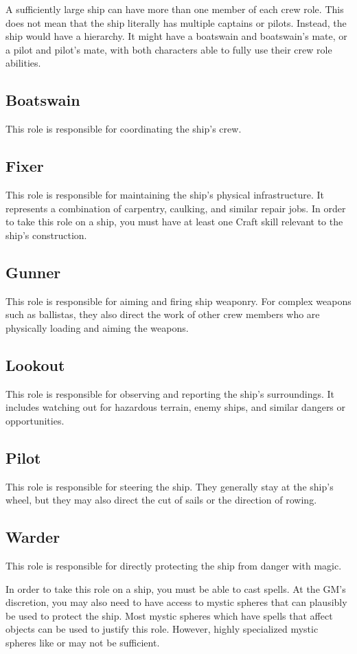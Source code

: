     A sufficiently large ship can have more than one member of each crew role.
    This does not mean that the ship literally has multiple captains or pilots.
    Instead, the ship would have a hierarchy.
    It might have a boatswain and boatswain's mate, or a pilot and pilot's mate, with both characters able to fully use their crew role abilities.

    \subsection{Boatswain}
        This role is responsible for coordinating the ship's crew.

    \subsection{Fixer}
        This role is responsible for maintaining the ship's physical infrastructure.
        It represents a combination of carpentry, caulking, and similar repair jobs.
        In order to take this role on a ship, you must have at least one Craft skill relevant to the ship's construction.

    \subsection{Gunner}
        This role is responsible for aiming and firing ship weaponry.
        For complex weapons such as ballistas, they also direct the work of other crew members who are physically loading and aiming the weapons.

    \subsection{Lookout}
        This role is responsible for observing and reporting the ship's surroundings.
        It includes watching out for hazardous terrain, enemy ships, and similar dangers or opportunities.

    \subsection{Pilot}
        This role is responsible for steering the ship.
        They generally stay at the ship's wheel, but they may also direct the cut of sails or the direction of rowing.

    \subsection{Warder}
        This role is responsible for directly protecting the ship from danger with magic.

        In order to take this role on a ship, you must be able to cast spells.
        At the GM's discretion, you may also need to have access to mystic spheres that can plausibly be used to protect the ship.
        Most mystic spheres which have spells that affect objects can be used to justify this role.
        However, highly specialized mystic spheres like  or  may not be sufficient.
